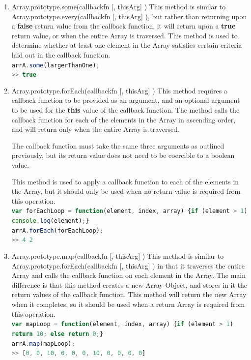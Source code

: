 \documentclass[a4paper,11pt,twoside]{report}
\def\jsinline{\lstinline[language=JavaScript, basicstyle=\small]}%\end{lstlisting}
\begin{document}
\begin{enumerate}
This method is used to determine whether every single element in an Array satisfies certain criteria laid out in the callback function.\\
\jsinline|var largerThanOne = function(element, index, array) {return element > 1;}|\\
\jsinline|arrA.every(largerThanOne);|\\
\jsinline|>> false|

\item Array.prototype.some(callbackfn [, thisArg] ) \newline
This method is similar to Array.prototype.every(callbackfn [, thisArg] ), but rather than returning upon a \textbf{false} return value from the callback function, it will return upon a \textbf{true} return value, or when the entire Array is traversed. This method is used to determine whether at least one element in the Array satisfies certain criteria laid out in the callback function.\\
\jsinline|arrA.some(largerThanOne);|\\
\jsinline|>> true|

\item Array.prototype.forEach(callbackfn [, thisArg] ) \newline
This method requires a callback function to be provided as an argument, and an optional argument to be used for the \textbf{this} value of the callback function. The method calls the callback function for each of the elements in the Array in ascending order, and will return only when the entire Array is traversed.

The callback function must take the same three arguments as outlined previously, but its return value does not need to be coercible to a boolean value.

This method is used to apply a callback function to each of the elements in the Array, but it should only be used when no return value is required from this operation.\\
\jsinline|var forEachLoop = function(element, index, array) {if (element > 1) console.log(element);}|\\
\jsinline|arrA.forEach(forEachLoop);|\\
\jsinline|>> 4 2|

\item Array.prototype.map(callbackfn [, thisArg] ) \newline
This method is similar to Array.prototype.forEach(callbackfn [, thisArg] ) in that it traverses the entire Array and calls the callback function on each element in the Array. The main difference is that this method creates a new Array Object, and stores in it the return values of the callback function. This method will return the new Array when it completes, so it should be used when a return Array is required from this operation.\\
\jsinline|var mapLoop = function(element, index, array) {if (element > 1) return 10; else return 0;}|\\
\jsinline|arrA.map(mapLoop);|\\
\jsinline|>> [0, 0, 10, 0, 0, 0, 10, 0, 0, 0, 0]|


\end{enumerate}
\end{document}
